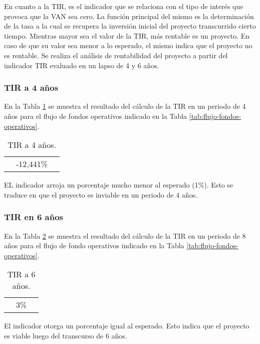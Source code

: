 En cuanto a la TIR, es el indicador que se relaciona con el tipo de interés que provoca que la VAN sea cero. La función principal del mismo es la determinación de la tasa a la cual se recupera la inversión inicial del proyecto transcurrido cierto tiempo. Mientras mayor sea el valor de la TIR, más rentable es un proyecto. En caso de que su valor sea menor a lo esperado, el mismo indica que el proyecto no es rentable. Se realiza el análisis de rentabilidad del proyecto a partir del indicador TIR evaluado en un lapso de 4 y 6 años.

\subsubsection{TIR a 4 años}

En la Tabla \ref{tab:tir-4} se muestra el resultado del cálculo de la TIR en un periodo de 4 años para el flujo de fondos operativos indicado en la Tabla \ref{tab:flujo-fondos-operativos}.

\begin{table}[H]
  \centering
    \begin{tabular}{|cc|r|}
    \rowcolor[rgb]{ .773,  .851,  .945} \multicolumn{3}{c}{\textbf{a 4 años}} \bigstrut[b]\\
    \hline
    \rowcolor[rgb]{ .773,  .851,  .945} \multicolumn{2}{|c|}{\textbf{TIR}} & \cellcolor[rgb]{ 1,  1,  1}\textcolor[rgb]{ 1,  0,  0}{-12,441\%} \bigstrut\\
    \hline
    \end{tabular}%
  \caption{TIR a 4 años.}    
  \label{tab:tir-4}%
\end{table}%


EL indicador arroja un porcentaje mucho menor al esperado (1\%). Esto se traduce en que el proyecto es inviable en un periodo de 4 años.

\subsubsection{TIR en 6 años}

En la Tabla \ref{tab:tir-6} se muestra el resultado del cálculo de la TIR en un periodo de 8 años para el flujo de fondo operativos indicado en la Tabla \ref{tab:flujo-fondos-operativos}.

\begin{table}[H]
  \centering
    \begin{tabular}{|cc|r|}
    \rowcolor[rgb]{ .773,  .851,  .945} \multicolumn{3}{c}{\textbf{a 8 años}} \bigstrut[b]\\
    \hline
    \rowcolor[rgb]{ .773,  .851,  .945} \multicolumn{2}{|c|}{\textbf{TIR}} & \cellcolor[rgb]{ 1,  1,  1}3\% \bigstrut\\
    \hline
    \end{tabular}%
  \caption{TIR a 6 años.}    
  \label{tab:tir-6}%
\end{table}%


El indicador otorga un porcentaje igual al esperado. Esto indica que el proyecto es viable luego del transcurso de 6 años.
